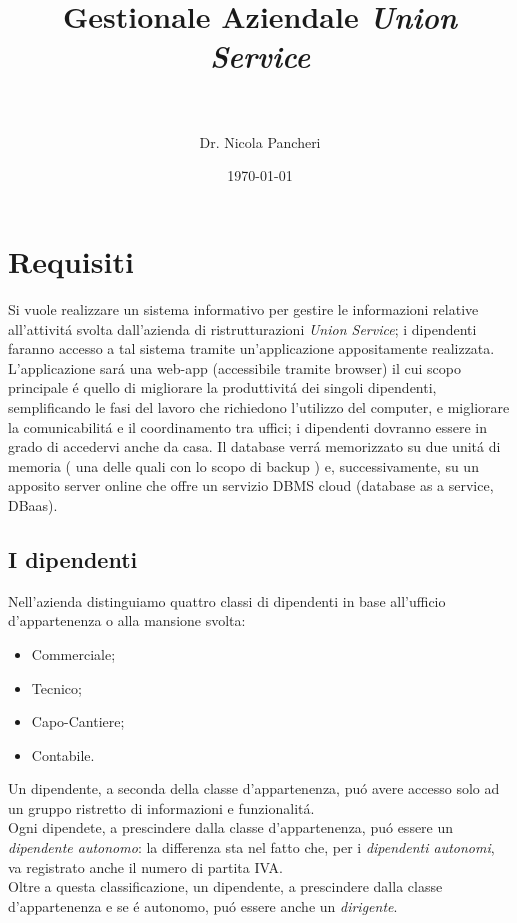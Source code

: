 \documentclass[paper=a4, fontsize=11pt]{scrartcl} %
\title{
\normalfont \normalsize
\textsc{} \\ [25pt] %
\horrule{0.5pt} \\[0.4cm] %
\huge Gestionale Aziendale \textit{Union Service} \\ %
\horrule{2pt} \\[0.5cm] %
}
\author{Dr. Nicola Pancheri}
\date{\normalsize\today} %
\numberwithin{equation}{section} %
\numberwithin{figure}{section} %
\numberwithin{table}{section} %
\begin{document}
\maketitle %
\tableofcontents
\newpage

\section{Requisiti}


Si vuole realizzare un sistema informativo per gestire le informazioni relative all'attivit\'a svolta
dall'azienda di ristrutturazioni \textit{Union Service};
i dipendenti faranno accesso a tal sistema tramite
un'applicazione appositamente realizzata.\\
L'applicazione sar\'a una web-app (accessibile tramite browser) il cui scopo
principale \'e quello di migliorare la produttivit\'a dei singoli dipendenti,
semplificando le fasi del lavoro che richiedono l'utilizzo del computer,
 e migliorare la comunicabilit\'a e il coordinamento tra uffici;
i dipendenti dovranno essere in grado di accedervi anche da casa.
Il database verr\'a memorizzato su due unit\'a di memoria ( una
delle quali con lo scopo di backup ) e, successivamente,
 su un apposito server online che offre un servizio DBMS cloud
 (database as a service, DBaas).\\

\subsection{I dipendenti}

Nell'azienda distinguiamo quattro classi di dipendenti in
base all'ufficio d'appartenenza o alla mansione svolta:
\begin{itemize}
	\item Commerciale;
	\item Tecnico;
	\item Capo-Cantiere;
	\item Contabile.
\end{itemize}

Un dipendente, a seconda della classe d'appartenenza, pu\'o avere accesso solo ad un gruppo ristretto di informazioni e funzionalit\'a.\\
Ogni dipendete, a prescindere dalla classe d'appartenenza, pu\'o essere un \textit{dipendente autonomo}: la differenza
sta nel fatto che, per i \textit{dipendenti autonomi}, va registrato anche il numero di partita IVA.\\
Oltre a questa classificazione, un dipendente, a prescindere dalla classe d'appartenenza e se \'e autonomo, pu\'o essere anche un
\textit{dirigente}.
\end{document}

